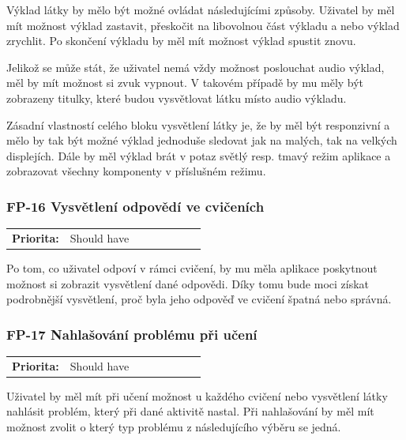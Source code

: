 Výklad látky by mělo být možné ovládat následujícími způsoby. Uživatel by měl mít možnost výklad zastavit, přeskočit na libovolnou část výkladu a nebo výklad zrychlit. Po skončení výkladu by měl mít možnost výklad spustit znovu.

Jelikož se může stát, že uživatel nemá vždy možnost poslouchat audio výklad, měl by mít možnost si zvuk vypnout. V takovém případě by mu měly být zobrazeny titulky, které budou vysvětlovat látku místo audio výkladu.

Zásadní vlastností celého bloku vysvětlení látky je, že by měl být responzivní a mělo by tak být možné výklad jednoduše sledovat jak na malých, tak na velkých displejích. Dále by měl výklad brát v potaz světlý resp. tmavý režim aplikace a zobrazovat všechny komponenty v příslušném režimu. 

\subsubsection{FP-16 Vysvětlení odpovědí ve cvičeních}\label{sec:fp-answer-explanation}

\begin{tabular}{lp{0.7\linewidth}}
    \textbf{Priorita:} & Should have \\
\end{tabular}

Po tom, co uživatel odpoví v rámci cvičení, by mu měla aplikace poskytnout možnost si zobrazit vysvětlení dané odpovědi. Díky tomu bude moci získat podrobnější vysvětlení, proč byla jeho odpověď ve cvičení špatná nebo správná.

\subsubsection{FP-17 Nahlašování problému při učení}\label{sec:fp-report-learning-issue}

\begin{tabular}{lp{0.7\linewidth}}
    \textbf{Priorita:} & Should have \\
\end{tabular}

Uživatel by měl mít při učení možnost u každého cvičení nebo vysvětlení látky nahlásit problém, který při dané aktivitě nastal. Při nahlašování by měl mít možnost zvolit o který typ problému z následujícího výběru se jedná.


